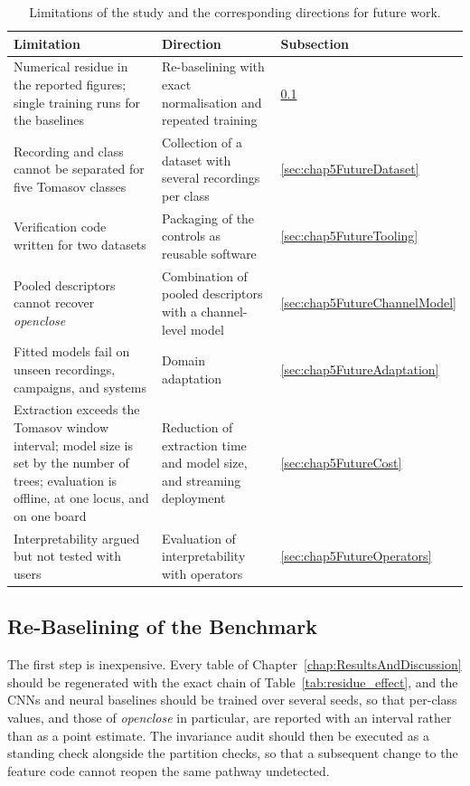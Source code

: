 \begin{table}[!htbp]
	\centering
	\caption{Limitations of the study and the corresponding directions for future work.}
	\label{tab:limits_future}
	\footnotesize
	\setlength{\tabcolsep}{4pt}
	\renewcommand{\arraystretch}{1.2}
	\begin{tabularx}{\textwidth}{@{}>{\raggedright\arraybackslash}X >{\raggedright\arraybackslash}X >{\raggedright\arraybackslash}p{1.8cm}@{}}
		\toprule
		\textbf{Limitation} & \textbf{Direction} & \textbf{Subsection}\\
		\midrule
		Numerical residue in the reported figures; single training runs for the baselines & Re-baselining with exact normalisation and repeated training & \ref{sec:chap5FutureBaseline}\\
		\addlinespace[3pt]
		Recording and class cannot be separated for five Tomasov classes & Collection of a dataset with several recordings per class & \ref{sec:chap5FutureDataset}\\
		\addlinespace[3pt]
		Verification code written for two datasets & Packaging of the controls as reusable software & \ref{sec:chap5FutureTooling}\\
		\addlinespace[3pt]
		Pooled descriptors cannot recover \emph{openclose} & Combination of pooled descriptors with a channel-level model & \ref{sec:chap5FutureChannelModel}\\
		\addlinespace[3pt]
		Fitted models fail on unseen recordings, campaigns, and systems & Domain adaptation & \ref{sec:chap5FutureAdaptation}\\
		\addlinespace[3pt]
		Extraction exceeds the Tomasov window interval; model size is set by the number of trees; evaluation is offline, at one locus, and on one board & Reduction of extraction time and model size, and streaming deployment & \ref{sec:chap5FutureCost}\\
		\addlinespace[3pt]
		Interpretability argued but not tested with users & Evaluation of interpretability with operators & \ref{sec:chap5FutureOperators}\\
		\bottomrule
	\end{tabularx}
\end{table}

\subsection{Re-Baselining of the Benchmark}
\label{sec:chap5FutureBaseline}
The first step is inexpensive. Every table of Chapter~\ref{chap:ResultsAndDiscussion} should be regenerated with the exact chain of Table~\ref{tab:residue_effect}, and the CNNs and neural baselines should be trained over several seeds, so that per-class values, and those of \emph{openclose} in particular, are reported with an interval rather than as a point estimate. The invariance audit should then be executed as a standing check alongside the partition checks, so that a subsequent change to the feature code cannot reopen the same pathway undetected.

